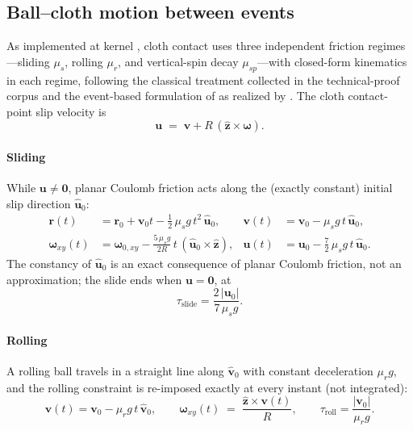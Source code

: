 \subsection{Ball--cloth motion between events}
\label{sec:appendix-eq-cloth}

As implemented at kernel , cloth contact uses three
independent friction regimes---sliding $\mu_s$, rolling $\mu_r$, and
vertical-spin decay $\mu_{sp}$---with closed-form kinematics in each
regime, following the classical treatment collected in the
technical-proof corpus \citep{alciatore_tp_catalog} and the event-based
formulation of \citet{leckie2006event} as realized by
\citet{kiefl2024pooltool}. The cloth contact-point slip velocity is
\begin{equation}
\mathbf{u} \;=\; \mathbf{v} + R\,(\hat{\mathbf{z}} \times
\boldsymbol{\omega}).
\label{eq:cloth-slip}
\end{equation}

\paragraph{Sliding} While $\mathbf{u} \neq \mathbf{0}$, planar Coulomb
friction acts along the (exactly constant) initial slip direction
$\hat{\mathbf{u}}_0$:
\begin{align}
\mathbf{r}(t) &= \mathbf{r}_0 + \mathbf{v}_0 t
  - \tfrac{1}{2}\,\mu_s g\,t^{2}\,\hat{\mathbf{u}}_0, &
\mathbf{v}(t) &= \mathbf{v}_0 - \mu_s g\,t\,\hat{\mathbf{u}}_0,
\label{eq:slide-rv}\\
\boldsymbol{\omega}_{xy}(t) &= \boldsymbol{\omega}_{0,xy}
  - \frac{5\,\mu_s g}{2R}\,t\,(\hat{\mathbf{u}}_0 \times
  \hat{\mathbf{z}}), &
\mathbf{u}(t) &= \mathbf{u}_0 - \tfrac{7}{2}\,\mu_s g\,t\,
  \hat{\mathbf{u}}_0.
\label{eq:slide-w}
\end{align}
The constancy of $\hat{\mathbf{u}}_0$ is an exact consequence of planar
Coulomb friction, not an approximation; the slide ends when
$\mathbf{u} = \mathbf{0}$, at
\begin{equation}
\tau_{\mathrm{slide}} = \frac{2\,|\mathbf{u}_0|}{7\,\mu_s g}.
\label{eq:slide-tau}
\end{equation}

\paragraph{Rolling} A rolling ball travels in a straight line along
$\hat{\mathbf{v}}_0$ with constant deceleration $\mu_r g$, and the
rolling constraint is re-imposed exactly at every instant (not
integrated):
\begin{equation}
\mathbf{v}(t) = \mathbf{v}_0 - \mu_r g\,t\,\hat{\mathbf{v}}_0,
\qquad
\boldsymbol{\omega}_{xy}(t) \;=\;
\frac{\hat{\mathbf{z}} \times \mathbf{v}(t)}{R},
\qquad
\tau_{\mathrm{roll}} = \frac{|\mathbf{v}_0|}{\mu_r g}.
\label{eq:roll}
\end{equation}

